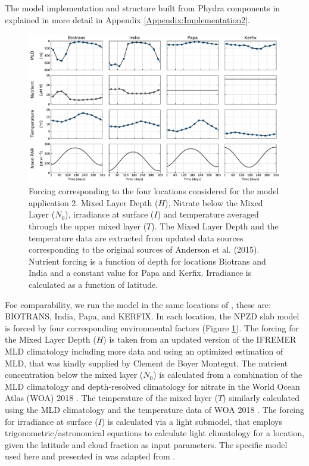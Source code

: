 \documentclass[journal abbreviation, manuscript]{copernicus}
\begin{document}
The model implementation and structure built from Phydra components in explained in more detail in Appendix \ref{Appendix:Implementation2}.
\begin{figure}[t]
\includegraphics[width=15cm]{Figures/firstdraft_plots/02_EMPOWER_forcing.pdf}
\caption{Forcing corresponding to the four locations considered for the model application 2. Mixed Layer Depth ($H$), Nitrate below the Mixed Layer ($N_0$), irradiance at surface ($I$) and temperature averaged through the upper mixed layer ($T$). The Mixed Layer Depth and the temperature data are extracted from updated data sources corresponding to the original sources of Anderson et al. (2015). Nutrient forcing is a function of depth for locations Biotrans and India and a constant value for Papa and Kerfix. Irradiance is calculated as a function of latitude.}
\label{Figure:EMPOWERforcing}
\end{figure}

Foe comparability, we run the model in the same locations of \citet{Anderson2015c}, these are: BIOTRANS, India, Papa, and KERFIX. In each location, the NPZD slab model is forced by four corresponding environmental factors (Figure \ref{Figure:EMPOWERforcing}). 
The forcing for the Mixed Layer Depth ($H$) is taken from an updated version of the IFREMER MLD climatology  \citep{DeBoyerMontegut2004} including more data and using an optimized estimation of MLD, that was kindly supplied by Clement de Boyer Montegut.
The nutrient concentration below the mixed layer ($N_0$) is calculated from a combination of the MLD climatology and depth-resolved climatology for nitrate in the World Ocean Atlas (WOA) 2018 \citep{Garcia2019WORLDSilicate}. The temperature of the mixed layer ($T$) similarly calculated using the MLD climatology and the temperature data of WOA 2018 \citep{Locarnini2019WorldTemperature}.
The forcing for irradiance at surface ($I$) is calculated via a light submodel, that employs trigonometric/astronomical equations to calculate light climatology for a location, given the latitude and cloud fraction as input parameters. The specific model used here and presented in \citet{Anderson2015c} was adapted from \citet{Shine1984ParametrizationAlbedo}.
\end{document}
